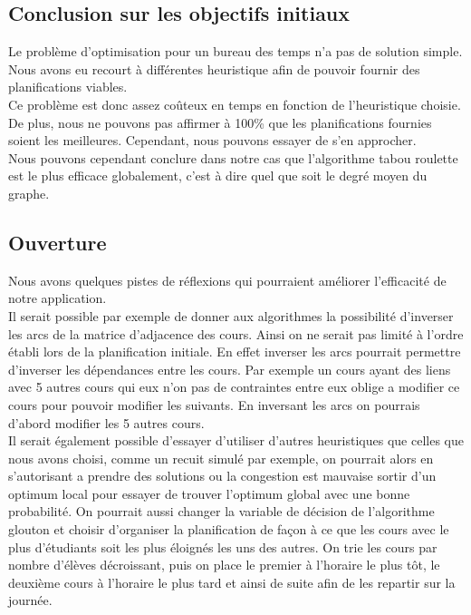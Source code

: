 \documentclass[a4paper,11pt]{article}
\begin{document}
	\subsection{Conclusion sur les objectifs initiaux}
		Le problème d'optimisation pour un bureau des temps n'a pas de solution simple. Nous avons eu recourt à différentes heuristique afin de pouvoir fournir des planifications viables.\\
		Ce problème est donc assez coûteux en temps en fonction de l'heuristique choisie. De plus, nous ne pouvons pas affirmer à 100\% que les planifications fournies soient les meilleures. Cependant, nous pouvons essayer de s'en approcher.\\
		Nous pouvons cependant conclure dans notre cas que l'algorithme tabou roulette est le plus efficace globalement, c'est à dire quel que soit le degré moyen du graphe.\\

	\subsection{Ouverture}
		Nous avons quelques pistes de réflexions qui pourraient améliorer l'efficacité de notre application.\\
		Il serait possible par exemple de donner aux algorithmes la possibilité d'inverser les arcs de la matrice d'adjacence des cours. Ainsi on ne serait pas limité à l'ordre établi lors de la planification initiale. En effet inverser les arcs pourrait permettre d'inverser les dépendances entre les cours. Par exemple un cours ayant des liens avec 5 autres cours qui eux n'on pas de contraintes entre eux oblige a modifier ce cours pour pouvoir modifier les suivants. En inversant les arcs on pourrais d'abord modifier les 5 autres cours. \\
		Il serait également possible d'essayer d'utiliser d'autres heuristiques que celles que nous avons choisi, comme un recuit simulé par exemple, on pourrait alors en s'autorisant a prendre des solutions ou la congestion est mauvaise sortir d'un optimum local pour essayer de trouver l'optimum global avec une bonne probabilité. On pourrait aussi changer la variable de décision de l'algorithme glouton et choisir d'organiser la planification de façon à ce que les cours avec le plus d'étudiants soit les plus éloignés les uns des autres. On trie les cours par nombre d'élèves décroissant, puis on place le premier à l'horaire le plus tôt, le deuxième cours à l'horaire le plus tard et ainsi de suite afin de les repartir sur la journée.
\end{document}
